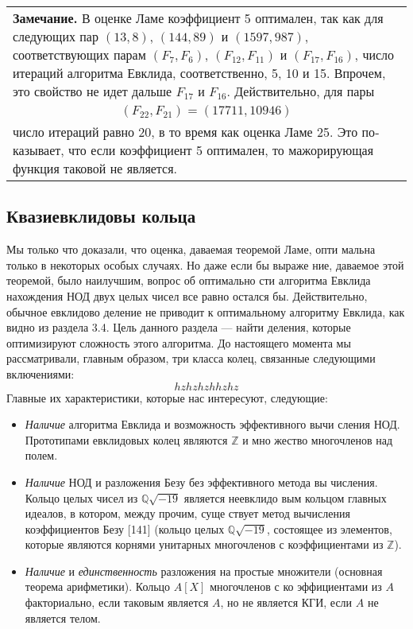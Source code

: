 \documentclass{mai_book}
\begin{document}
\begin{center}
\begin{tabular}{p{12cm}}
\textbf{Замечание.} В оценке Ламе коэффициент 5 оптимален, так как для следующих пар $(13,8)$, $(144,89)$ и $(1597,987)$, соответствующих парам $(F_{7},F_{6})$, $(F_{12},F_{11})$ и $(F_{17},F_{16})$, число итераций алго­ритма Евклида, соответственно, 5, 10 и 15. Впрочем, это свойство
не идет дальше $F_{17}$ и $F_{16}$. Действительно, для пары
\\
$$(F_{22},F_{21})=(17711,10946)$$
\\
число итераций равно 20, в то время как оценка Ламе 25. Это по­
казывает, что если коэффициент 5 оптимален, то мажорирующая
функция таковой не является.
\end{tabular}
\end{center}
\newpage
\subsection{Квазиевклидовы кольца}
\noindent Мы только что доказали, что оценка, даваемая теоремой Ламе, опти­
мальна только в некоторых особых случаях. Но даже если бы выраже­
ние, даваемое этой теоремой, было наилучшим, вопрос об оптимально­
сти алгоритма Евклида нахождения НОД двух целых чисел все равно
остался бы. Действительно, обычное евклидово деление не приводит
к оптимальному алгоритму Евклида, как видно из раздела 3.4. Цель
данного раздела — найти деления, которые оптимизируют сложность
этого алгоритма. До настоящего момента мы рассматривали, главным
образом, три класса колец, связанные следующими включениями:
$$hzhzhzhhzhz$$
Главные их характеристики, которые нас интересуют, следующие:
\begin{itemize}


\item\textit{Наличие} алгоритма Евклида и возможность эффективного вычи­
сления НОД. Прототипами евклидовых колец являются $\mathbb{Z}$ и мно­
жество многочленов над полем.

\item\textit{Наличие} НОД и разложения Безу без эффективного метода вы­
числения. Кольцо целых чисел из $\mathbb{Q}\sqrt{-19}$ является неевклидо­
вым кольцом главных идеалов, в котором, между прочим, суще­
ствует метод вычисления коэффициентов Безу [141] (кольцо це­лых $\mathbb{Q}\sqrt{-19}$, состоящее из элементов, которые являются корнями
унитарных многочленов с коэффициентами из $\mathbb{Z}$).

\item\textit{Наличие} и \textit{единственность} разложения на простые множители
(основная теорема арифметики). Кольцо $A[X]$ многочленов с ко­
эффициентами из $A$ факториально, если таковым является $A$, но
не является КГИ, если $A$ не является телом.
\end{itemize}
\end{document}

